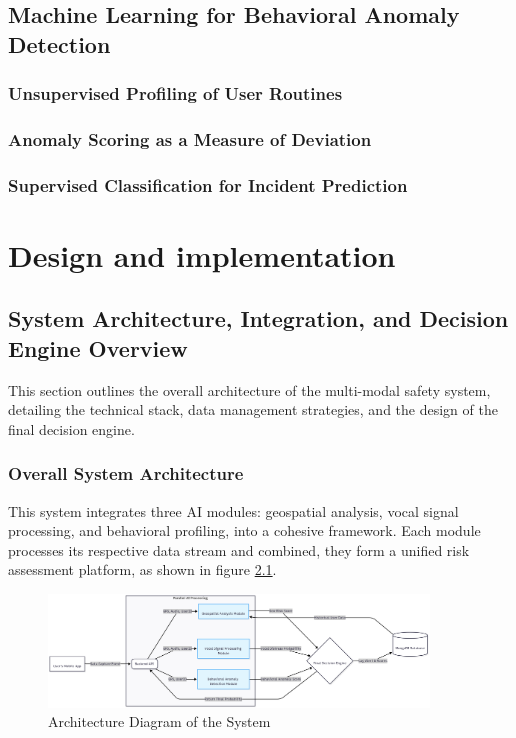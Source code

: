 \documentclass[12pt,a4paper,oneside,english]{book}
\begin{document}
{\section{Machine Learning for Behavioral Anomaly Detection}
\label{sec:behavioral_theory}
\subsection{Unsupervised Profiling of User Routines}
\label{sec:unsupervised_profiling}
\subsection{ Anomaly Scoring as a Measure of Deviation}
\label{sec:anomaly_scoring}
\subsection{Supervised Classification for Incident Prediction}
\label{sec:supervised_classification}


\chapter{Design and implementation}
\label{ch:4eme}

\section{System Architecture, Integration, and Decision Engine Overview}
\label{sec:system_architecture}
This section outlines the overall architecture of the multi-modal safety system, detailing the technical stack, data management strategies, and the design of the final decision engine.
\subsection{Overall System Architecture}
This system integrates three AI modules: geospatial analysis, vocal signal processing, and behavioral profiling, into a cohesive framework. 
Each module processes its respective data stream and combined, they form a unified risk assessment platform, as shown in figure \ref{fig:architecture}.
\begin{figure}[h!] %
    \centering
    \includegraphics[width=0.9\textwidth]{images/diag5.png}
    \caption{Architecture Diagram of the System}
    \label{fig:architecture}
\end{figure}


}
\end{document}
